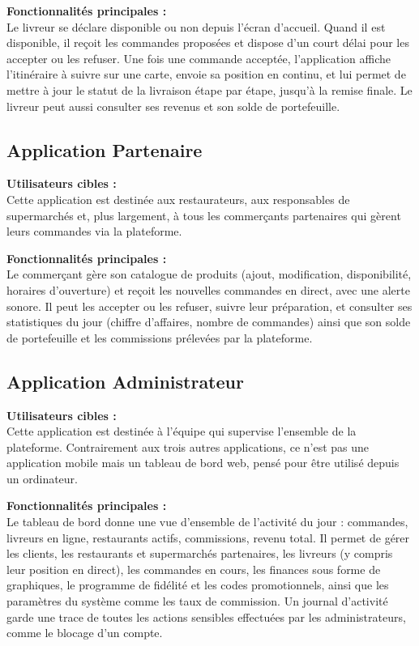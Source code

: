 \documentclass[12pt,fleqn,a4paper]{report}
\begin{document}
\begin{justify}
\vspace{0.3cm}
\textbf{Fonctionnalités principales :}\\
Le livreur se déclare disponible ou non depuis l'écran d'accueil. Quand il est disponible, il reçoit les commandes proposées et dispose d'un court délai pour les accepter ou les refuser. Une fois une commande acceptée, l'application affiche l'itinéraire à suivre sur une carte, envoie sa position en continu, et lui permet de mettre à jour le statut de la livraison étape par étape, jusqu'à la remise finale. Le livreur peut aussi consulter ses revenus et son solde de portefeuille.

\subsection{Application Partenaire}
\textbf{Utilisateurs cibles :}\\
Cette application est destinée aux restaurateurs, aux responsables de supermarchés et, plus largement, à tous les commerçants partenaires qui gèrent leurs commandes via la plateforme.

\vspace{0.3cm}
\textbf{Fonctionnalités principales :}\\
Le commerçant gère son catalogue de produits (ajout, modification, disponibilité, horaires d'ouverture) et reçoit les nouvelles commandes en direct, avec une alerte sonore. Il peut les accepter ou les refuser, suivre leur préparation, et consulter ses statistiques du jour (chiffre d'affaires, nombre de commandes) ainsi que son solde de portefeuille et les commissions prélevées par la plateforme.

\subsection{Application Administrateur}
\textbf{Utilisateurs cibles :}\\
Cette application est destinée à l'équipe qui supervise l'ensemble de la plateforme. Contrairement aux trois autres applications, ce n'est pas une application mobile mais un tableau de bord web, pensé pour être utilisé depuis un ordinateur.

\vspace{0.3cm}
\textbf{Fonctionnalités principales :}\\
Le tableau de bord donne une vue d'ensemble de l'activité du jour : commandes, livreurs en ligne, restaurants actifs, commissions, revenu total. Il permet de gérer les clients, les restaurants et supermarchés partenaires, les livreurs (y compris leur position en direct), les commandes en cours, les finances sous forme de graphiques, le programme de fidélité et les codes promotionnels, ainsi que les paramètres du système comme les taux de commission. Un journal d'activité garde une trace de toutes les actions sensibles effectuées par les administrateurs, comme le blocage d'un compte.


\end{justify}
\end{document}
